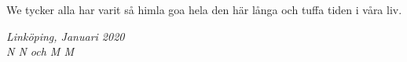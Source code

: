\begin{acknowledgments}
  We tycker alla har varit så himla goa hela den här långa och tuffa tiden i våra liv.

  \addvspace{1em}
  \begin{flushright}
    \textit{%
      Linköping, Januari 2020\\
      N N och M M%
    }
  \end{flushright}
\end{acknowledgments}
